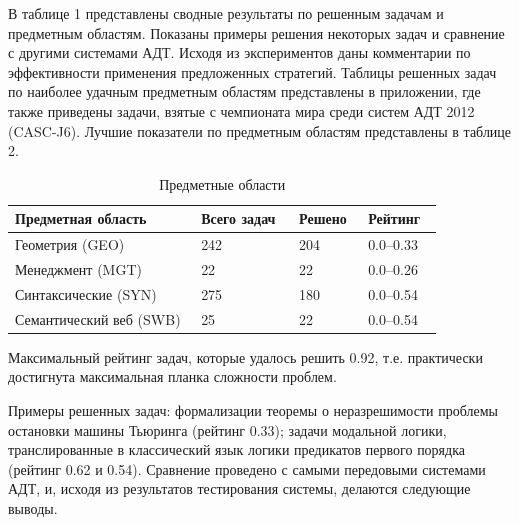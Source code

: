\documentclass[a4paper]{report}
\begin{document}
В таблице 1 представлены сводные результаты по решенным задачам и предметным областям. Показаны примеры решения некоторых задач и сравнение с другими системами АДТ. Исходя из экспериментов даны комментарии по эффективности применения предложенных стратегий. Таблицы решенных задач по наиболее удачным предметным областям представлены в приложении, где также приведены задачи, взятые с чемпионата мира среди систем АДТ 2012 (CASC-J6). Лучшие показатели по предметным областям представлены в таблице 2.

\begin{longtable}[htb]{|p{0.38\linewidth}|p{0.2\linewidth}|p{0.12\linewidth}|p{0.15\linewidth}|}
\caption{Предметные области}\label{tabli2}\\
\hline
\textbf{Предметная область} & \textbf{Всего задач} & \textbf{Решено} & \textbf{Рейтинг}\\
\hline
Геометрия (GEO) & 242 & 204 & 0.0--0.33\\
\hline
Менеджмент (MGT) & 22 & 22 & 0.0--0.26\\
\hline
Синтаксические (SYN) & 275 & 180 & 0.0--0.54\\
\hline
Семантический веб (SWB) & 25 & 22 & 0.0--0.54\\
\hline
\end{longtable}



Максимальный рейтинг задач, которые удалось решить 0.92, т.е. практически достигнута максимальная планка сложности проблем.

Примеры решенных задач: формализации теоремы о неразрешимости проблемы остановки машины Тьюринга (рейтинг 0.33); задачи модальной логики, транслированные в классический язык логики предикатов первого порядка (рейтинг 0.62 и 0.54). Сравнение проведено с самыми передовыми системами АДТ, и, исходя из результатов тестирования системы, делаются следующие выводы.
\end{document}
